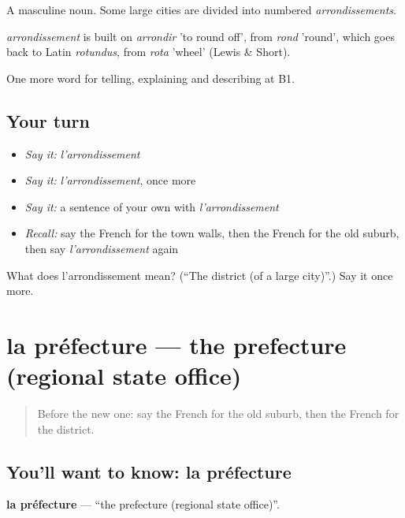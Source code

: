 A masculine noun. Some large cities are divided into numbered \emph{arrondissements}.

\begin{cousinweb}
\emph{arrondissement} is built on \emph{arrondir} 'to round off', from \emph{rond} 'round', which goes back to Latin \emph{rotundus}, from \emph{rota} 'wheel' (Lewis \& Short).
\end{cousinweb}

\begin{grammarlens}[title={What you've built}]
One more word for telling, explaining and describing at B1.
\end{grammarlens}

\subsection*{Your turn}
\begin{itemize}
\raggedright
  \item \emph{Say it:} \emph{l'arrondissement}
  \item \emph{Say it:} \emph{l'arrondissement}, once more
  \item \emph{Say it:} a sentence of your own with \emph{l'arrondissement}
  \item \emph{Recall:} say the French for the town walls, then the French for the old suburb, then say \emph{l'arrondissement} again
\end{itemize}

\begin{tcolorbox}[breakable,colback=teal!4,colframe=teal!35!black,title={Before you move on}]
What does l'arrondissement mean? (\textquotedblleft{}The district (of a large city)\textquotedblright{}.) Say it once more.
\end{tcolorbox}
\section[la préfecture]{la préfecture — the prefecture (regional state office)}

\label{lesson:FR-C440-prefecture}



\begin{quote}
Before the new one: say the French for the old suburb, then the French for the district.
\end{quote}

\subsection*{You'll want to know: la préfecture}
\textbf{la préfecture} — \textquotedblleft{}the prefecture (regional state office)\textquotedblright{}.

